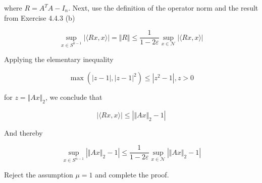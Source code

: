 \documentclass{article}
\begin{document}
where $R = A^TA - I_n$. Next, use the definition of the operator norm and the result from Exercise 4.4.3 (b)

$$\sup_{x \in S^{n-1}}|\langle Rx, x \rangle| = \Vert R \Vert \leq \frac{1}{1-2\varepsilon}\sup_{x \in \mathcal N}|\langle Rx, x \rangle|$$

Applying the elementary inequality

$$\max(|z-1|, |z - 1|^2) \leq |z^2 - 1|, z>0$$

for $z = \Vert Ax \Vert_2$, we conclude that

$$|\langle Rx, x \rangle| \leq |\Vert Ax \Vert_2 - 1|$$

And thereby

$$\sup_{x \in S^{n-1}}|\Vert Ax \Vert_2 - 1| \leq \frac{1}{1 - 2\varepsilon}\sup_{x \in \mathcal N}|\Vert Ax \Vert_2 - 1|$$

Reject the assumption $\mu = 1$ and complete the proof.
\end{document}
